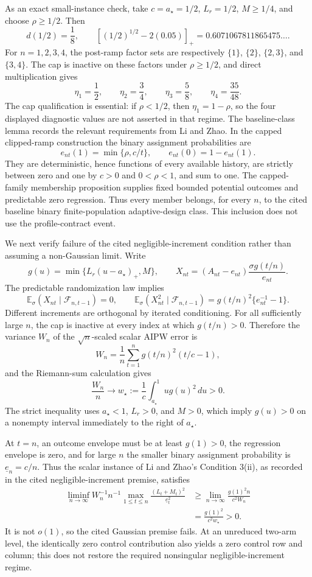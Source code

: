 As an exact small-instance check, take \(c=a_\star=1/2\), \(L_r=1/2\), \(M\ge1/4\), and choose \(\rho\ge1/2\).  Then
\[
 d(1/2)=\frac18,
 \qquad
 \left[(1/2)^{1/2}-2(0.05)\right]_+
 =0.6071067811865475\ldots.
\]
For \(n=1,2,3,4\), the post-ramp factor sets are respectively \(\{1\}\), \(\{2\}\), \(\{2,3\}\), and \(\{3,4\}\).  The cap is inactive on these factors under \(\rho\ge1/2\), and direct multiplication gives
\[
 \eta_1=\frac12,
 \qquad \eta_2=\frac34,
 \qquad \eta_3=\frac58,
 \qquad \eta_4=\frac{35}{48}.
\]
The cap qualification is essential: if \(\rho<1/2\), then \(\eta_1=1-\rho\), so the four displayed diagnostic values are not asserted in that regime.
The baseline-class lemma records the relevant requirements from Li and Zhao.  In the capped clipped-ramp construction the binary assignment probabilities are
\[
 e_{nt}(1)=\min\{\rho,c/t\},
 \qquad
 e_{nt}(0)=1-e_{nt}(1).
\]
They are deterministic, hence functions of every available history, are strictly between zero and one by \(c>0\) and \(0<\rho<1\), and sum to one.  The capped-family membership proposition supplies fixed bounded potential outcomes and predictable zero regression.  Thus every member belongs, for every \(n\), to the cited baseline binary finite-population adaptive-design class.  This inclusion does not use the profile-contract event.

We next verify failure of the cited negligible-increment condition rather than assuming a non-Gaussian limit.  Write
\[
 g(u)=\min\{L_r(u-a_\star)_+,M\},
 \qquad
 X_{nt}=(A_{nt}-e_{nt})\frac{\sigma g(t/n)}{e_{nt}}.
\]
The predictable randomization law implies
\[
 \mathbb E_\sigma(X_{nt}\mid\mathcal F_{n,t-1})=0,
 \qquad
 \mathbb E_\sigma(X_{nt}^2\mid\mathcal F_{n,t-1})
 =g(t/n)^2\{e_{nt}^{-1}-1\}.
\]
Different increments are orthogonal by iterated conditioning.  For all sufficiently large \(n\), the cap is inactive at every index at which \(g(t/n)>0\).  Therefore the variance \(W_n\) of the \(\sqrt n\)-scaled scalar AIPW error is
\[
 W_n=\frac1n\sum_{t=1}^n g(t/n)^2(t/c-1),
\]
and the Riemann-sum calculation gives
\[
 \frac{W_n}{n}\longrightarrow
 w_\star:=\frac1c\int_{a_\star}^1u g(u)^2\,du>0.
\]
The strict inequality uses \(a_\star<1\), \(L_r>0\), and \(M>0\), which imply \(g(u)>0\) on a nonempty interval immediately to the right of \(a_\star\).

At \(t=n\), an outcome envelope must be at least \(g(1)>0\), the regression envelope is zero, and for large \(n\) the smaller binary assignment probability is \(\underline e_n=c/n\).  Thus the scalar instance of Li and Zhao's Condition 3(ii), as recorded in the cited negligible-increment premise, satisfies
\[
\begin{aligned}
 \liminf_{n\to\infty}
 W_n^{-1}n^{-1}
 \max_{1\le t\le n}\frac{(L_t+M_t)^2}{\underline e_t^2}
 &\ge
 \lim_{n\to\infty}
 \frac{g(1)^2n}{c^2W_n}\\
 &=\frac{g(1)^2}{c^2w_\star}>0.
\end{aligned}
\]
It is not \(o(1)\), so the cited Gaussian premise fails.  At an unreduced two-arm level, the identically zero control contribution also yields a zero control row and column; this does not restore the required nonsingular negligible-increment regime.

